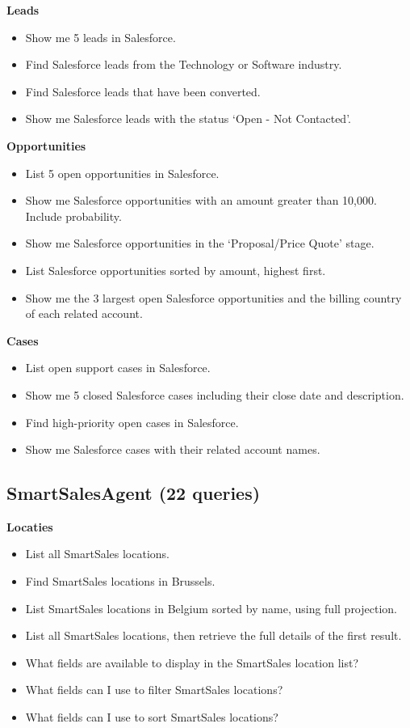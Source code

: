 \begin{appendices}
\textbf{Leads}
\begin{itemize}[noitemsep]
  \item Show me 5 leads in Salesforce.
  \item Find Salesforce leads from the Technology or Software industry.
  \item Find Salesforce leads that have been converted.
  \item Show me Salesforce leads with the status `Open - Not Contacted'.
\end{itemize}

\textbf{Opportunities}
\begin{itemize}[noitemsep]
  \item List 5 open opportunities in Salesforce.
  \item Show me Salesforce opportunities with an amount greater than 10,000. Include probability.
  \item Show me Salesforce opportunities in the `Proposal/Price Quote' stage.
  \item List Salesforce opportunities sorted by amount, highest first.
  \item Show me the 3 largest open Salesforce opportunities and the billing country of each related account.
\end{itemize}

\textbf{Cases}
\begin{itemize}[noitemsep]
  \item List open support cases in Salesforce.
  \item Show me 5 closed Salesforce cases including their close date and description.
  \item Find high-priority open cases in Salesforce.
  \item Show me Salesforce cases with their related account names.
\end{itemize}

\subsection*{SmartSalesAgent (22 queries)}

\textbf{Locaties}
\begin{itemize}[noitemsep]
  \item List all SmartSales locations.
  \item Find SmartSales locations in Brussels.
  \item List SmartSales locations in Belgium sorted by name, using full projection.
  \item List all SmartSales locations, then retrieve the full details of the first result.
  \item What fields are available to display in the SmartSales location list?
  \item What fields can I use to filter SmartSales locations?
  \item What fields can I use to sort SmartSales locations?
\end{itemize}


\end{appendices}
